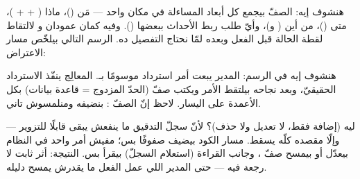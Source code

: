 هنشوف إيه: الصفّ بيجمع كل أبعاد المساءلة في مكان واحد — مَن ()،
ماذا ( +  + )، متى
()، من أين ( و)، وأيّ طلب
ربط الأحداث ببعضها (). وفيه كمان عمودان  و
 لالتقاط لقطة الحالة قبل الفعل وبعده لمّا نحتاج التفصيل ده. الرسم
التالي بيلخّص مسار الاعتراض:

\begin{center}\begin{LTR}
\end{LTR}\end{center}

هنشوف إيه في الرسم: المدير يبعت أمر استرداد موسومًا بـ\code{[Auditable]}. المعالِج
ينفّذ الاسترداد الحقيقيّ، وبعد نجاحه بيلتقط  الأمر ويكتب صفّ
 (الحدّ المزدوج = قاعدة بيانات) بكل الأعمدة على اليسار. لاحظ إنّ
الصفّ : بنضيفه ومنلمسوش تاني.

\begin{secnote}
ليه  (إضافة فقط، لا تعديل ولا حذف)؟ لأنّ سجلّ التدقيق ما ينفعش
يبقى قابلًا للتزوير — وإلّا مقصده كلّه يسقط. مسار الكود بيضيف صفوفًا بس؛ مفيش أمر
واحد في النظام بيعدّل أو بيمسح صفّ ، وجانب القراءة (استعلام السجلّ)
بيقرأ بس. النتيجة: أثر ثابت لا رجعة فيه — حتى المدير اللي عمل الفعل ما يقدرش
يمسح دليله.
\end{secnote}

